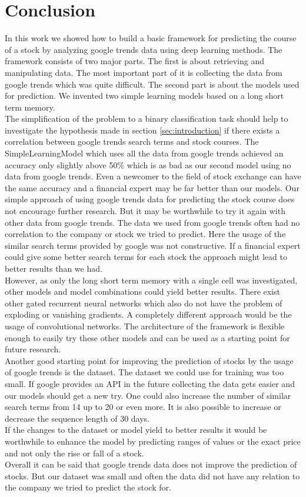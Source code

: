 \section{Conclusion}
\label{sec:ausblick}
In this work we showed how to build a basic framework for predicting the course of a stock by analyzing google trends data using deep learning methods. The framework consists of two major parts. The first is about retrieving and manipulating data. The most important part of it is collecting the data from google trends which was quite difficult. The second part is about the models used for prediction. We invented two simple learning models based on a long short term memory.\\
The simplification of the problem to a binary classification task should help to investigate the hypothesis made in section \ref{sec:introduction} if there exists a correlation between google trends search terms and stock courses. The SimpleLearningModel which uses all the data from google trends achieved an accuracy only slightly above 50\% which is as bad as our second model using no data from google trends. Even a newcomer to the field of stock exchange can have the same accuracy and a financial expert may be far better than our models. Our simple approach of using google trends data for predicting the stock course does not encourage further research. But it may be worthwhile to try it again with other data from google trends. The data we used from google trends often had no correlation to the company or stock we tried to predict. Here the usage of the similar search terms provided by google was not constructive. If a financial expert could give some better search terms for each stock the approach might lead to better results than we had.\\
However, as only the long short term memory with a single cell was investigated, other models and model combinations could yield better results. There exist other gated recurrent neural networks which also do not have the problem of exploding or vanishing gradients. A completely different approach would be the usage of convolutional networks. The architecture of the framework is flexible enough to easily try these other models and can be used as a starting point for future research.\\
Another good starting point for improving the prediction of stocks by the usage of google trends is the dataset. The dataset we could use for training was too small. If google provides an API in the future collecting the data gets easier and our models should get a new try. One could also increase the number of similar search terms from 14 up to 20 or even more. It is also possible to increase or decrease the sequence length of 30 days.\\
If the changes to the dataset or model yield to better results it would be worthwhile to enhance the model by predicting ranges of values or the exact price and not only the rise or fall of a stock.\\
Overall it can be said that google trends data does not improve the prediction of stocks. But our dataset was small and often the data did not have any relation to the company we tried to predict the stock for.
